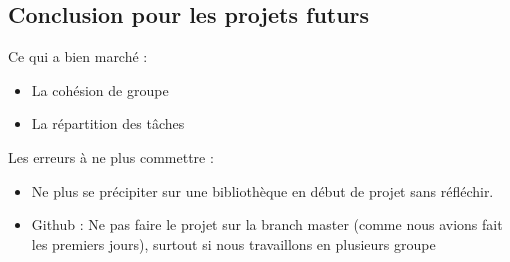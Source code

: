 \documentclass[a4paper,oneside]{article}
\begin{document}
\subsection{Conclusion pour les projets futurs}

Ce qui a bien marché :
\begin{itemize}
	\item La cohésion de groupe
	\item La répartition des tâches
	\newline
	\\
\end{itemize}

Les erreurs à ne plus commettre :
\begin{itemize}
	\item Ne plus se précipiter sur une bibliothèque en début de projet sans réfléchir.
	\item Github : Ne pas faire le projet sur la branch master (comme nous avions fait les premiers jours), surtout si nous travaillons en plusieurs groupe
\end{itemize}




\label{myLastPage}
\end{document}
